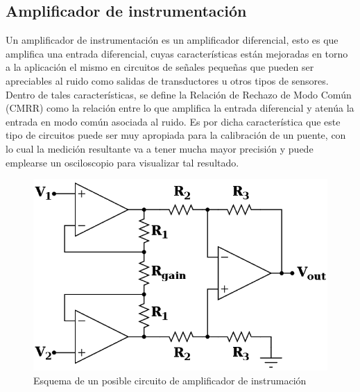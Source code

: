 \subsection{Amplificador de instrumentaci\'on}
Un amplificador de instrumentaci\'on es un amplificador diferencial, esto es que amplifica una entrada diferencial, cuyas caracter\'isticas est\'an mejoradas en torno a la aplicaci\'on el mismo
en circuitos de se\~nales peque\~nas que pueden ser apreciables al ruido como salidas de transductores u otros tipos de sensores. Dentro de tales caracter\'isticas, se define la Relaci\'on de Rechazo de Modo Com\'un (CMRR) como la relaci\'on
entre lo que amplifica la entrada diferencial y aten\'ua la entrada en modo com\'un asociada al ruido. Es por dicha caracter\'istica que este tipo de circuitos puede ser muy apropiada para la calibraci\'on de un puente,
con lo cual la medici\'on resultante va a tener mucha mayor precisi\'on y puede emplearse un osciloscopio para visualizar tal resultado.

\begin{figure}[H]
    \centering
        \includegraphics[scale=0.3]{Recursos/instrumentation.png}
    \caption{Esquema de un posible circuito de amplificador de instrumaci\'on}
    \label{fig:amplificador_instrumentacion}
\end{figure}